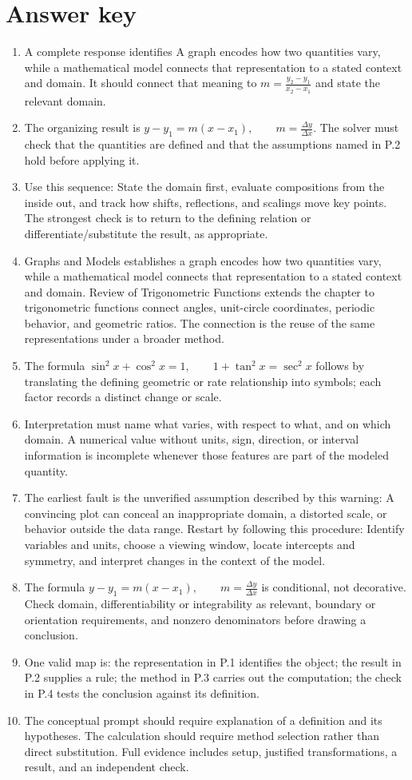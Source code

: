\documentclass[11pt]{article}
\begin{document}
\section{Answer key}
\small
\begin{enumerate}
\item A complete response identifies A graph encodes how two quantities vary, while a mathematical model connects that representation to a stated context and domain. It should connect that meaning to \(m=\frac{y_2-y_1}{x_2-x_1}\) and state the relevant domain.
\item The organizing result is \(y-y_1=m(x-x_1),\qquad m=\frac{\Delta y}{\Delta x}\). The solver must check that the quantities are defined and that the assumptions named in P.2 hold before applying it.
\item Use this sequence: State the domain first, evaluate compositions from the inside out, and track how shifts, reflections, and scalings move key points. The strongest check is to return to the defining relation or differentiate/substitute the result, as appropriate.
\item Graphs and Models establishes a graph encodes how two quantities vary, while a mathematical model connects that representation to a stated context and domain. Review of Trigonometric Functions extends the chapter to trigonometric functions connect angles, unit-circle coordinates, periodic behavior, and geometric ratios. The connection is the reuse of the same representations under a broader method.
\item The formula \(\sin^2 x+\cos^2 x=1,\qquad 1+\tan^2x=\sec^2x\) follows by translating the defining geometric or rate relationship into symbols; each factor records a distinct change or scale.
\item Interpretation must name what varies, with respect to what, and on which domain. A numerical value without units, sign, direction, or interval information is incomplete whenever those features are part of the modeled quantity.
\item The earliest fault is the unverified assumption described by this warning: A convincing plot can conceal an inappropriate domain, a distorted scale, or behavior outside the data range. Restart by following this procedure: Identify variables and units, choose a viewing window, locate intercepts and symmetry, and interpret changes in the context of the model.
\item The formula \(y-y_1=m(x-x_1),\qquad m=\frac{\Delta y}{\Delta x}\) is conditional, not decorative. Check domain, differentiability or integrability as relevant, boundary or orientation requirements, and nonzero denominators before drawing a conclusion.
\item One valid map is: the representation in P.1 identifies the object; the result in P.2 supplies a rule; the method in P.3 carries out the computation; the check in P.4 tests the conclusion against its definition.
\item The conceptual prompt should require explanation of a definition and its hypotheses. The calculation should require method selection rather than direct substitution. Full evidence includes setup, justified transformations, a result, and an independent check.
\end{enumerate}
\end{document}
